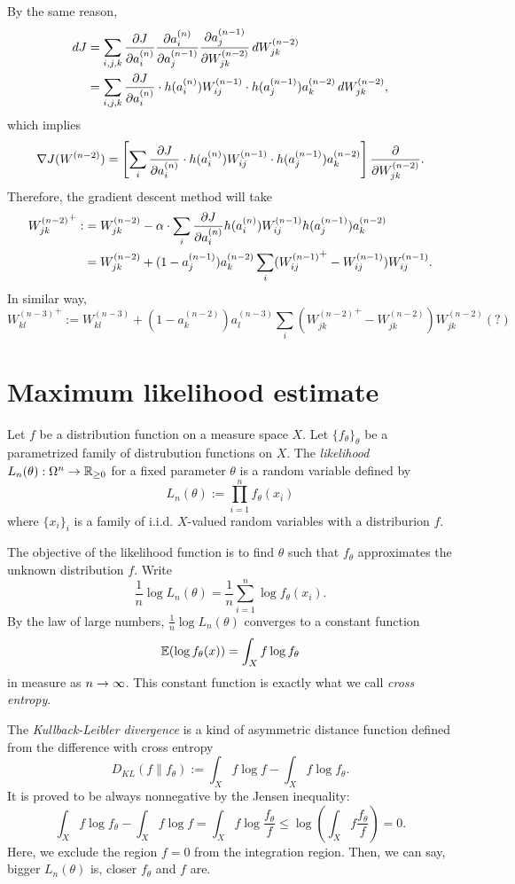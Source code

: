 \documentclass{../exp}
\begin{document}
By the same reason,
\begin{align*}
dJ&=\sum_{i,j,k}\pd{J}{a_i^{(n)}}\pd{a_i^{(n)}}{a_j^{(n-1)}}\pd{a_j^{(n-1)}}{W_{jk}^{(n-2)}}\,dW_{jk}^{(n-2)}\\
&=\sum_{i,j,k}\pd{J}{a_i^{(n)}}\cdot h(a_i^{(n)})W_{ij}^{(n-1)}\cdot h(a_j^{(n-1)})a_k^{(n-2)}\,dW_{jk}^{(n-2)},
\end{align*}
which implies
\[\del J(W^{(n-2)})=\left[\sum_i\pd{J}{a_i^{(n)}}\cdot h(a_i^{(n)})W_{ij}^{(n-1)}\cdot h(a_j^{(n-1)})a_k^{(n-2)}\right]\pd{W_{jk}^{(n-2)}}.\]
Therefore, the gradient descent method will take
\begin{align*}
{W_{jk}^{(n-2)}}^+:&=W_{jk}^{(n-2)}-\alpha\cdot\sum_i\pd{J}{a_i^{(n)}}h(a_i^{(n)})W_{ij}^{(n-1)}h(a_j^{(n-1)})a_k^{(n-2)}\\
&=W_{jk}^{(n-2)}+(1-a_j^{(n-1)})a_k^{(n-2)}\sum_i({W_{ij}^{(n-1)}}^+-W_{ij}^{(n-1)})W_{ij}^{(n-1)}.
\end{align*}
In similar way,
\[{W_{kl}^{(n-3)}}^+:=W_{kl}^{(n-3)}+(1-a_k^{(n-2)})a_l^{(n-3)}\sum_i({W_{jk}^{(n-2)}}^+-W_{jk}^{(n-2)})W_{jk}^{(n-2)}(?)\]




\section{Maximum likelihood estimate}
\begin{defn}
Let $f$ be a distribution function on a measure space $X$.
Let $\{f_\theta\}_\theta$ be a parametrized family of distrubution functions on $X$.
The \emph{likelihood} $L_n(\theta):\Omega^n\to\R_{\ge0}$ for a fixed parameter $\theta$ is a random variable defined by
\[L_n(\theta):=\prod_{i=1}^nf_\theta(x_i)\]
where $\{x_i\}_i$ is a family of i.i.d. $X$-valued random variables with a distriburion $f$.
\end{defn}
The objective of the likelihood function is to find $\theta$ such that $f_\theta$ approximates the unknown distribution $f$.
Write
\[\frac1n\log L_n(\theta)=\frac1n\sum_{i=1}^n\log f_\theta(x_i).\]
By the law of large numbers, $\frac1n\log L_n(\theta)$ converges to a constant function
\[\mathbb{E}(\log f_\theta(x))=\int_Xf\log f_\theta\]
in measure as $n\to\oo$.
This constant function is exactly what we call \emph{cross entropy}.

The \emph{Kullback-Leibler divergence} is a kind of asymmetric distance function defined from the difference with cross entropy
\[D_{KL}(f\|f_\theta):=\int_Xf\log f-\int_Xf\log f_\theta.\]
It is proved to be always nonnegative by the Jensen inequality: 
\[\int_Xf\log f_\theta-\int_Xf\log f=\int_Xf\log\frac{f_\theta}f\le\log\left(\int_Xf\frac{f_\theta}f\right)=0.\]
Here, we exclude the region $f=0$ from the integration region.
Then, we can say, bigger $L_n(\theta)$ is, closer $f_\theta$ and $f$ are.
\end{document}
